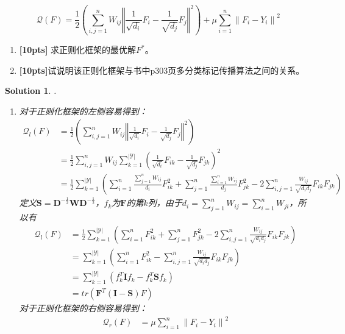 \documentclass[a4paper,UTF8]{article}
\newtheorem*{solution}{Solution}
\numberwithin{equation}{section}
\begin{document}
\begin{equation}
\mathcal{Q}(F)=\frac{1}{2}\left(\sum_{i, j=1}^{n} W_{i j}\left\Vert\frac{1}{\sqrt{d_{i}}} F_{i}-\frac{1}{\sqrt{d_{j}}} F_{j}\right\Vert^{2}\right)+\mu \sum_{i=1}^{n}\left\|F_{i}-Y_{i}\right\|^{2}
\end{equation}
\begin{enumerate}
	\item  \textbf{[10pts]} 求正则化框架的最优解$F^*$。
	\item  \textbf{[10pts]}试说明该正则化框架与书中p303页多分类标记传播算法之间的关系。
\end{enumerate}

\begin{solution}.
\begin{enumerate}[$1.$]
	\item 对于正则化框架的左侧容易得到：
	\begin{align*}
		\mathcal{Q}_{l}(F)&=\frac{1}{2}\left(\sum_{i, j=1}^{n} W_{i j}\left\Vert\frac{1}{\sqrt{d_{i}}} F_{i}-\frac{1}{\sqrt{d_{j}}} F_{j}\right\Vert^{2}\right)\\
		&=\frac{1}{2}\sum_{i,j=1}^nW_{ij}\sum_{k=1}^{|\mathcal{Y}|} (\frac{1}{\sqrt{d_{i}}} F_{ik}-\frac{1}{\sqrt{d_{j}}} F_{jk})^2\\
		&=\frac{1}{2}\sum_{k=1}^{|\mathcal{Y}|}(\sum_{i=1}^n\frac{\sum_{j=1}^nW_{ij}}{d_i}F_{ik}^2+\sum_{j=1}^n\frac{\sum_{i=1}^nW_{ij}}{d_j}F_{jk}^2-2\sum_{i,j=1}^n\frac{W_{ij}}{\sqrt{d_id_j}}F_{ik}F_{jk})
	\end{align*}
      定义$\mathbf{S}=\mathbf{D}^{-\frac{1}{2}}\mathbf{W}\mathbf{D}^{-\frac{1}{2}}$，$f_k$为$\mathbf{F}$的第$k$列，由于$d_i=\sum_{j=1}^{n}W_{ij}=\sum_{i=1}^n W_{ji}$，所以有
      \begin{align*}
      	\mathcal{Q}_{l}(F)
      	&=\frac{1}{2}\sum_{k=1}^{|\mathcal{Y}|}(\sum_{i=1}^nF_{ik}^2+\sum_{j=1}^n F_{jk}^2-2\sum_{i,j=1}^n\frac{W_{ij}}{\sqrt{d_id_j}}F_{ik}F_{jk})\\
      	&=\sum_{k=1}^{|\mathcal{Y}|}(\sum_{i=1}^nF_{ik}^2-\sum_{i,j=1}^n\frac{W_{ij}}{\sqrt{d_id_j}}F_{ik}F_{jk})\\
      	&=\sum_{k=1}^{|\mathcal{Y}|}(f_k^T\mathbf{I}f_k-f_k^T\mathbf{S}f_k)\\
      	&=tr(\mathbf{F}^T(\mathbf{I}-\mathbf{S})F)
      \end{align*}
       对于正则化框架的右侧容易得到：
       \begin{align*}
       	\mathcal{Q}_{r}(F)&=\mu\sum_{i=1}^{n}\left\|F_{i}-Y_{i}\right\|^{2}\\

\end{align*}
\end{enumerate}
\end{solution}
\end{document}
